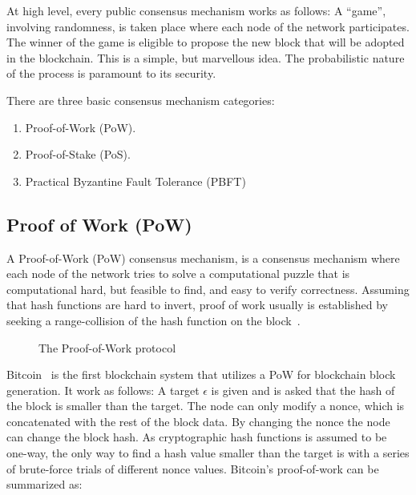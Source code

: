 At high level, every public consensus mechanism works as follows: A ``game'', involving randomness, is taken place where each node of the network participates. The winner of the game is eligible to propose the new block that will be adopted in the blockchain. This is a simple, but marvellous idea. The probabilistic nature of the process is paramount to its security.

There are three basic consensus mechanism categories:

\begin{enumerate}
  \item Proof-of-Work (PoW).
  \item Proof-of-Stake (PoS).
  \item Practical Byzantine Fault Tolerance (PBFT)
\end{enumerate}


\subsection{Proof of Work (PoW)}\label{blockchain:consensus:pow}

A Proof-of-Work (PoW) consensus mechanism, is a consensus mechanism where each node of the network tries to solve a computational puzzle that is computational hard, but feasible to find, and easy to verify correctness. Assuming that hash functions are hard to invert, proof of work usually is established by seeking a range-collision of the hash function on the block~\cite{zindros_thesis}.

\begin{figure}[!ht]
  \centering
  \caption{The Proof-of-Work protocol}
  \label{fig:consensus:pow}
\end{figure}

Bitcoin~\cite{Zohar:2015:BUH:2817191.2701411} is the first blockchain system that utilizes a PoW for blockchain block generation. It work as follows: A target $\epsilon$ is given and is asked that the hash of the block is smaller than the target. The node can only modify a nonce, which is concatenated with the rest of the block data. By changing the nonce the node can change the block hash. As cryptographic hash functions is assumed to be one-way, the only way to find a hash value smaller than the target is with a series of brute-force trials of different nonce values. Bitcoin's proof-of-work can be summarized as:

